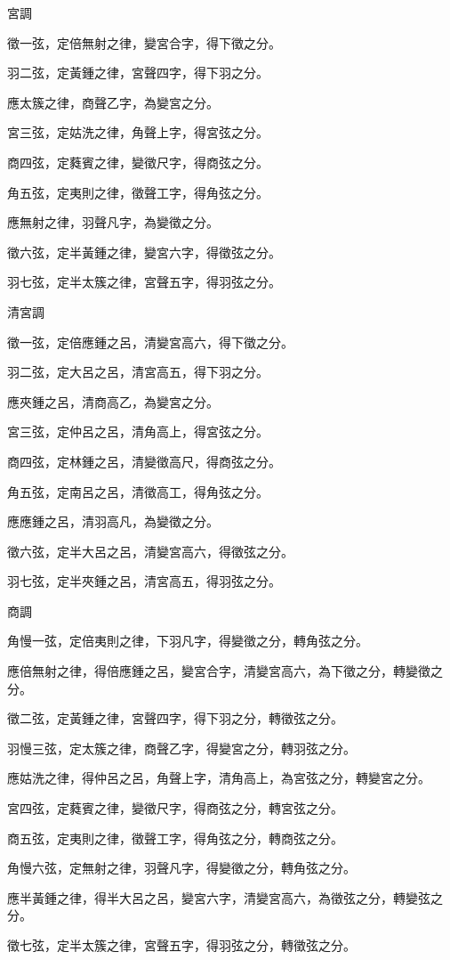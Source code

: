 \begin{pinyinscope}
宮調

徵一弦，定倍無射之律，變宮合字，得下徵之分。

羽二弦，定黃鍾之律，宮聲四字，得下羽之分。

應太簇之律，商聲乙字，為變宮之分。

宮三弦，定姑洗之律，角聲上字，得宮弦之分。

商四弦，定蕤賓之律，變徵尺字，得商弦之分。

角五弦，定夷則之律，徵聲工字，得角弦之分。

應無射之律，羽聲凡字，為變徵之分。

徵六弦，定半黃鍾之律，變宮六字，得徵弦之分。

羽七弦，定半太簇之律，宮聲五字，得羽弦之分。

清宮調

徵一弦，定倍應鍾之呂，清變宮高六，得下徵之分。

羽二弦，定大呂之呂，清宮高五，得下羽之分。

應夾鍾之呂，清商高乙，為變宮之分。

宮三弦，定仲呂之呂，清角高上，得宮弦之分。

商四弦，定林鍾之呂，清變徵高尺，得商弦之分。

角五弦，定南呂之呂，清徵高工，得角弦之分。

應應鍾之呂，清羽高凡，為變徵之分。

徵六弦，定半大呂之呂，清變宮高六，得徵弦之分。

羽七弦，定半夾鍾之呂，清宮高五，得羽弦之分。

商調

角慢一弦，定倍夷則之律，下羽凡字，得變徵之分，轉角弦之分。

應倍無射之律，得倍應鍾之呂，變宮合字，清變宮高六，為下徵之分，轉變徵之分。

徵二弦，定黃鍾之律，宮聲四字，得下羽之分，轉徵弦之分。

羽慢三弦，定太簇之律，商聲乙字，得變宮之分，轉羽弦之分。

應姑洗之律，得仲呂之呂，角聲上字，清角高上，為宮弦之分，轉變宮之分。

宮四弦，定蕤賓之律，變徵尺字，得商弦之分，轉宮弦之分。

商五弦，定夷則之律，徵聲工字，得角弦之分，轉商弦之分。

角慢六弦，定無射之律，羽聲凡字，得變徵之分，轉角弦之分。

應半黃鍾之律，得半大呂之呂，變宮六字，清變宮高六，為徵弦之分，轉變弦之分。

徵七弦，定半太簇之律，宮聲五字，得羽弦之分，轉徵弦之分。


\end{pinyinscope}
